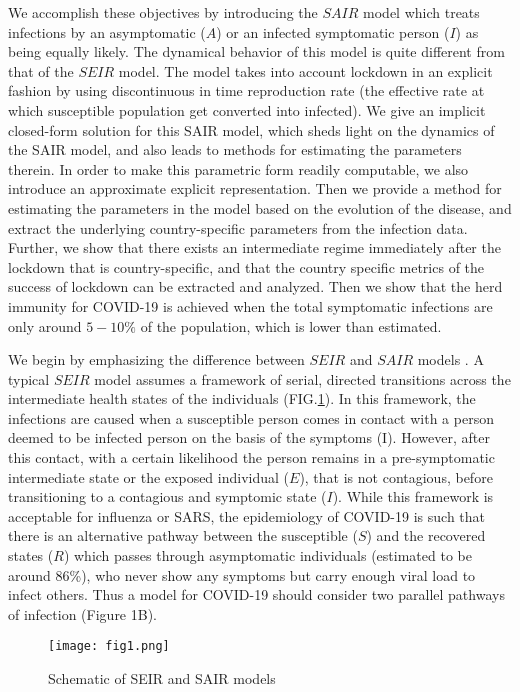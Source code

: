 \documentclass[aps,prl,reprint,superscriptaddress]{revtex4-1}
\begin{document}
We accomplish these objectives by introducing the $SAIR$ model which treats infections by an asymptomatic ($A$) or an infected symptomatic person ($I$) as being equally likely. The dynamical behavior of this model is quite different from that of the $SEIR$ model. The model takes into account lockdown in an explicit fashion by using discontinuous in time reproduction rate (the effective rate at which susceptible population get converted into infected). We give an implicit closed-form solution for this SAIR model, which sheds light on the dynamics of the SAIR model, and also leads to methods for estimating the parameters therein. In order to make this parametric form readily computable, we also introduce an approximate explicit representation. Then we provide a method for estimating the parameters in the model based on the evolution of the disease, and extract the underlying country-specific parameters from the infection data. Further, we show that there exists an intermediate regime immediately after the lockdown that is country-specific, and that the country specific metrics of the success of lockdown can be extracted and analyzed. Then we show that the herd immunity for COVID-19 is achieved when the total symptomatic infections are only around  $5-10\%$ of the population, which is lower than estimated. 

We begin by emphasizing the difference between $SEIR$ and $SAIR$ models \cite{robinson2013model}.  A typical $SEIR$ model assumes a framework of serial, directed transitions across the intermediate health states of the individuals (FIG.\ref{fig1}). In this framework, the infections are caused when a susceptible person comes in contact with a person deemed to be infected person on the basis of the symptoms (I). However, after this contact, with a certain likelihood the person remains in a pre-symptomatic intermediate state or the exposed individual ($E$), that is not contagious, before transitioning to a contagious and symptomic state ($I$). While this framework is acceptable for influenza or SARS, the epidemiology of COVID-19 is such that there is an alternative pathway between the susceptible ($S$) and the recovered states ($R$) which passes through asymptomatic individuals (estimated to be around 86\%),\cite{asymptomatic} who never show any symptoms but carry enough viral load to infect others. Thus a model for COVID-19 should consider two parallel pathways of infection (Figure 1B).
\begin{figure}[h]
	\texttt{[image: fig1.png]}
	\caption{\label{fig1}Schematic of SEIR and SAIR models}
\end{figure}
   
\end{document}
